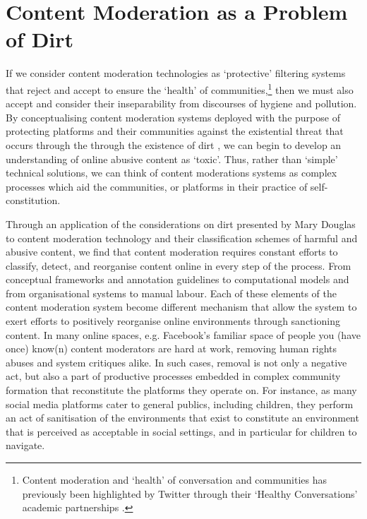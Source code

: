\section{Content Moderation as a Problem of Dirt}
If we consider content moderation technologies as `protective' filtering systems that reject and accept to ensure the `health' of communities,\footnote{Content moderation and `health' of conversation and communities has previously been highlighted by Twitter through their `Healthy Conversations' academic partnerships \citep{Twitter:Health:2018}.} then we must also accept and consider their inseparability from discourses of hygiene and pollution. By conceptualising content moderation systems deployed with the purpose of protecting platforms and their communities against the existential threat that occurs through the through the existence of dirt \cite{Lepawsky:2019}, we can begin to develop an understanding of online abusive content as `toxic'. Thus, rather than `simple' technical solutions, we can think of content moderations systems as complex processes which aid the communities, or platforms in their practice of self-constitution.

Through an application of the considerations on dirt presented by Mary Douglas \citeyear{Douglas:1966} to content moderation technology and their classification schemes of harmful and abusive content, we find that content moderation requires constant efforts to classify, detect, and reorganise content online in every step of the process. From conceptual frameworks and annotation guidelines to computational models and from organisational systems to manual labour. Each of these elements of the content moderation system become different mechanism that allow the system to exert efforts to positively reorganise online environments through sanctioning content. In many online spaces, e.g. Facebook's familiar space of people you (have once) know(n) content moderators are hard at work, removing human rights abuses and system critiques alike. In such cases, removal is not only a negative act, but also a part of productive processes embedded in complex community formation that reconstitute the platforms they operate on. For instance, as many social media platforms cater to general publics, including children, they perform an act of sanitisation of the environments that exist to constitute an environment that is perceived as acceptable in social settings, and in particular for children to navigate.

